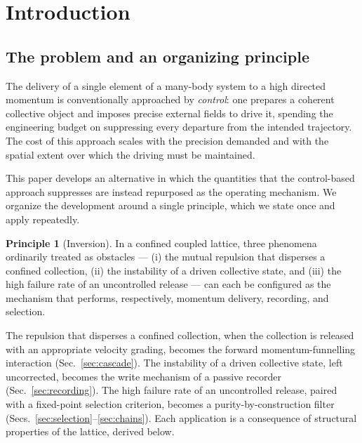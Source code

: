 \documentclass[twocolumn,10pt,a4paper]{article}
\theoremstyle{thmstyle}
\theoremstyle{definition}
\newtheorem{principle}[theorem]{Principle}
\theoremstyle{remark}
\begin{document}
\tableofcontents

\section{Introduction}
\label{sec:intro}

\subsection{The problem and an organizing principle}

The delivery of a single element of a many-body system to a high directed
momentum is conventionally approached by \emph{control}: one prepares a
coherent collective object and imposes precise external fields to drive it,
spending the engineering budget on suppressing every departure from the
intended trajectory. The cost of this approach scales with the precision
demanded and with the spatial extent over which the driving must be
maintained.

This paper develops an alternative in which the quantities that the
control-based approach suppresses are instead repurposed as the operating
mechanism. We organize the development around a single principle, which we
state once and apply repeatedly.

\begin{principle}[Inversion]
\label{prin:inversion}
In a confined coupled lattice, three phenomena ordinarily treated as
obstacles --- (i) the mutual repulsion that disperses a confined collection,
(ii) the instability of a driven collective state, and (iii) the high failure
rate of an uncontrolled release --- can each be configured as the mechanism
that performs, respectively, momentum delivery, recording, and selection.
\end{principle}

The repulsion that disperses a confined collection, when the collection is
released with an appropriate velocity grading, becomes the forward
momentum-funnelling interaction (Sec.~\ref{sec:cascade}). The instability of
a driven collective state, left uncorrected, becomes the write mechanism of a
passive recorder (Sec.~\ref{sec:recording}). The high failure rate of an
uncontrolled release, paired with a fixed-point selection criterion, becomes
a purity-by-construction filter (Secs.~\ref{sec:selection}--\ref{sec:chains}).
Each application is a consequence of structural properties of the lattice,
derived below.
\end{document}
